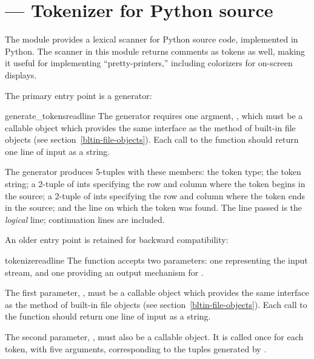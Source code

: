 \section{ ---
         Tokenizer for Python source}



The  module provides a lexical scanner for Python
source code, implemented in Python.  The scanner in this module
returns comments as tokens as well, making it useful for implementing
``pretty-printers,'' including colorizers for on-screen displays.

The primary entry point is a generator:

\begin{funcdesc}{generate_tokens}{readline}
  The  generator requires one argment,
  , which must be a callable object which
  provides the same interface as the  method of
  built-in file objects (see section~\ref{bltin-file-objects}).  Each
  call to the function should return one line of input as a string.

  The generator produces 5-tuples with these members:
  the token type;
  the token string;
  a 2-tuple  of ints specifying the
  row and column where the token begins in the source;
  a 2-tuple  of ints specifying the
  row and column where the token ends in the source;
  and the line on which the token was found.
  The line passed is the \emph{logical} line;
  continuation lines are included.
\end{funcdesc}

An older entry point is retained for backward compatibility:

\begin{funcdesc}{tokenize}{readline}
  The  function accepts two parameters: one
  representing the input stream, and one providing an output mechanism
  for .

  The first parameter, , must be a callable object which
  provides the same interface as the  method of
  built-in file objects (see section~\ref{bltin-file-objects}).  Each
  call to the function should return one line of input as a string.

  The second parameter, , must also be a callable
  object.  It is called once for each token, with five arguments,
  corresponding to the tuples generated by .
\end{funcdesc}



